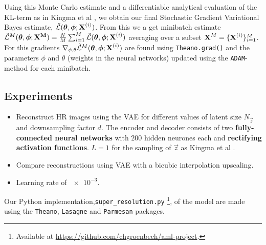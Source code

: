 Using this Monte Carlo estimate and a differentiable analytical evaluation of the KL-term as in Kingma et al \cite{Kingma2013}, we obtain our final Stochastic Gradient Variational Bayes estimate, $\tilde{\mathcal{L}}(\bm{\mathrm{\theta}},\bm{\mathrm{\phi}};\bm{\mathrm{X}}^{(i)})$. From this we a get minibatch estimate $\tilde{\mathcal{L}}^M(\bm{\mathrm{\theta}},\bm{\mathrm{\phi}};\bm{\mathrm{X^M}}) = \frac{N}{M}\sum^{M}_{i=1}\tilde{\mathcal{L}}(\bm{\mathrm{\theta}},\bm{\mathrm{\phi}};\bm{\mathrm{X}}^{(i)})$ averaging over a subset $\bm{\mathrm{X}}^M = \{\bm{\mathrm{X}}^{(i)}\}^M_{i=1}$. 
For this gradients $\nabla_{\phi,\theta} \tilde{\mathcal{L}}^M(\bm{\mathrm{\theta}},\bm{\mathrm{\phi}};\bm{\mathrm{X}}^{(i)})$ are found using \texttt{Theano.grad()} and the parameters $\phi$ and $\theta$ (weights in the neural networks) updated using the \texttt{ADAM}-method \cite{Kingma2014b} for each minibatch. 



\subsection{Experiments}
\label{sub:experiments}

\begin{itemize}
	\item Reconstruct HR images using the VAE for different values of latent size $N_{\vec{z}}$ and downsampling factor $d$. The encoder and decoder consists of two \textbf{fully-connected neural networks} with $200$ hidden neurones each and \textbf{rectifying activation functions}. $L = 1$ for the sampling of $\vec{z}$ as Kingma et al \cite{Kingma2013}.
	\item Compare reconstructions using VAE with a bicubic interpolation upscaling.
	\item Learning rate of $\num{e-3}$.
\end{itemize}
Our Python implementation,\texttt{super_resolution.py} \footnote{Available at \url{https://github.com/chgroenbech/aml-project}.}, of the model are made using the \texttt{Theano}, \texttt{Lasagne} and \texttt{Parmesan} packages. 

